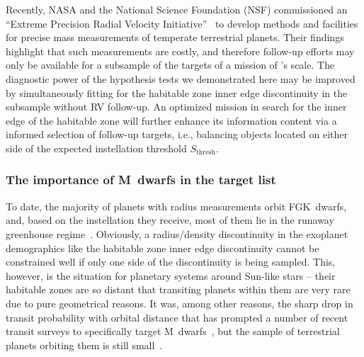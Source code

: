 \documentclass[twocolumn,twocolappendix]{aastex631}
\begin{document}
Recently, NASA and the National Science Foundation (NSF) commissioned an ``Extreme Precision Radial Velocity Initiative''~\citep{Crass2021} to develop methods and facilities for precise mass measurements of temperate terrestrial planets.
Their findings highlight that such measurements are costly, and therefore follow-up efforts may only be available for a subsample of the targets of a mission of \plato's scale.
The diagnostic power of the hypothesis tests we demonstrated here may be improved by simultaneously fitting for the habitable zone inner edge discontinuity in the subsample without RV follow-up.
An optimized mission in search for the inner edge of the habitable zone will further enhance its information content via a informed selection of follow-up targets, i.e., balancing objects located on either side of the expected instellation threshold $S_\mathrm{thresh}$.

\subsubsection{The importance of M~dwarfs in the target list}
To date, the majority of planets with radius measurements orbit FGK~dwarfs, and, based on the instellation they receive, most of them lie in the runaway greenhouse regime~\citep{Thompson2018}.
Obviously, a radius/density discontinuity in the exoplanet demographics like the habitable zone inner edge discontinuity cannot be constrained well if only one side of the discontinuity is being sampled.
This, however, is the situation for planetary systems around Sun-like stars -- their habitable zones are so distant that transiting planets within them are very rare due to pure geometrical reasons.
It was, among other reasons, the sharp drop in transit probability with orbital distance that has prompted a number of recent transit surveys to specifically target M~dwarfs~\citep[e.g.,][]{Irwin2009,Obermeier2016,Delrez2018,Sebastian2021,Dietrich2023}, but the sample of terrestrial planets orbiting them is still small~\citep[e.g.,][]{Berger2020,Hardegree-Ullman2020a}.
\end{document}
